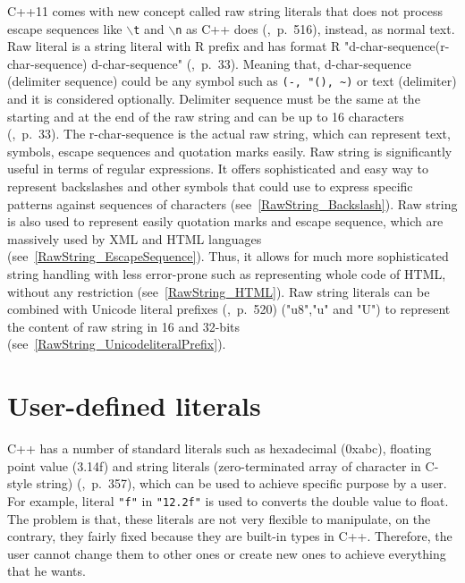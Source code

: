 \documentclass[11pt]{report}
\begin{document}
C++11 comes with new concept called raw string literals that does not process escape sequences like \texttt{$\backslash$t} and \texttt{$\backslash$n} as C++ does (\cite{Stroustrup:2012:Cpp11},~p.~516), instead, as normal text. Raw literal is a string literal with R prefix and has format R "d-char-sequence(r-char-sequence) d-char-sequence" (\cite{ISO:2011:Cpplanguage},~p.~33). Meaning that, d-char-sequence (delimiter sequence) could be any symbol such as \texttt{(-, "(), \~{})} or text (delimiter) and it is considered optionally. Delimiter sequence must be the same at the starting and at the end of the raw string and can be up to 16 characters (\cite{ISO:2011:Cpplanguage},~p.~33). The r-char-sequence is the actual raw string, which can represent text, symbols, escape sequences and quotation marks easily. Raw string is significantly useful in terms of regular expressions. It offers sophisticated and easy way to represent backslashes and other symbols that could use to express specific patterns against sequences of characters (see~\ref{RawString_Backslash}). Raw string is also used to represent easily quotation marks and escape sequence, which are massively used by XML and HTML languages (see~\ref{RawString_EscapeSequence}). Thus, it allows for much more sophisticated string handling with less error-prone such as representing whole code of HTML, without any restriction (see~\ref{RawString_HTML}). Raw string literals can be combined with Unicode literal prefixes (\cite{Gregorie:professionalcpp},~p.~520) ("u8","u" and "U") to represent the content of raw string in 16 and 32-bits (see~\ref{RawString_UnicodeliteralPrefix}).

\section{User-defined literals}
\label{section: User-defined literals}
C++ has a number of standard literals such as hexadecimal (0xabc), floating point value (3.14f) and string literals (zero-terminated array of character in C-style string) (\cite{Overland:2011:CWF},~p.~357), which can be used to achieve specific purpose by a user. For example, literal \texttt{"f"} in \texttt{"12.2f"} is used to converts the double value to float. The problem is that, these literals are not very flexible to manipulate, on the contrary, they fairly fixed because they are built-in types in C++. Therefore, the user cannot change them to other ones or create new ones to achieve everything that he wants.
\end{document}
